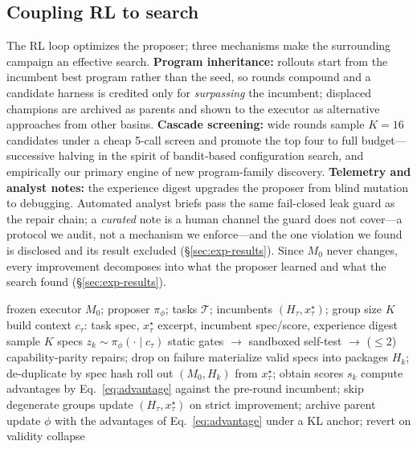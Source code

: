 \subsection{Coupling RL to search}
\label{sec:method-search}

The RL loop optimizes the proposer; three mechanisms make the surrounding
campaign an effective search.  \textbf{Program inheritance:} rollouts start
from the incumbent best program rather than the seed, so rounds compound and
a candidate harness is credited only for \emph{surpassing} the incumbent;
displaced champions are archived as parents and shown to the executor as
alternative approaches from other basins.  \textbf{Cascade screening:} wide
rounds sample $K{=}16$ candidates under a cheap 5-call screen and promote
the top four to full budget---successive halving in the spirit of
bandit-based configuration search, and empirically our primary engine of new
program-family discovery.  \textbf{Telemetry and analyst notes:} the
experience digest upgrades the proposer from blind mutation to debugging.
Automated analyst briefs pass the same fail-closed leak guard as the repair
chain; a \emph{curated} note is a human channel the guard does not
cover---a protocol we audit, not a mechanism we enforce---and the one
violation we found is disclosed and its result excluded
(\S\ref{sec:exp-results}).  Since $M_0$ never changes, every improvement decomposes into what the
proposer learned and what the search found (\S\ref{sec:exp-results}).

\begin{algorithm}[t]
\caption{One outer round of \method{}}
\label{alg:outer}
\begin{algorithmic}[1]
\Require frozen executor $M_0$; proposer $\pi_\phi$; tasks $\mathcal{T}$;
         incumbents $(H_\tau, x^\star_\tau)$; group size $K$
  \State build context $c_\tau$: task spec, $x^\star_\tau$ excerpt, incumbent
         spec/score, experience digest
  \State sample $K$ specs $z_k \sim \pi_\phi(\cdot \mid c_\tau)$
    \State static gates $\to$ sandboxed self-test $\to$ ($\le 2$)
           capability-parity repairs; drop on failure
           \COMMENT{\S\ref{sec:method-safety}}
  \EndFor
  \State materialize valid specs into packages $H_k$; de-duplicate by spec hash
  \State roll out $(M_0, H_k)$ from $x^\star_\tau$; obtain scores $s_k$
  \State compute advantages by Eq.~\eqref{eq:advantage} against the pre-round
         incumbent; skip degenerate groups
  \State update $(H_\tau, x^\star_\tau)$ on strict improvement; archive parent
\EndFor
\State update $\phi$ with the advantages of Eq.~\eqref{eq:advantage} under a KL anchor; revert on validity collapse
\end{algorithmic}
\end{algorithm}
